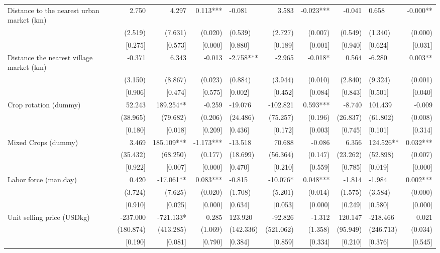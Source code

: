 \documentclass[
]{article}
\begin{document}
\begin{landscape}
\begin{ThreePartTable}
\begin{longtable}[t]{lrrrlrrrlr}
Distance to the nearest urban market (km) & 2.750 & 4.297 & 0.113*** & -0.081 & 3.583 & -0.023*** & -0.041 & 0.658 & -0.000**\\
 & (2.519) & (7.631) & (0.020) & (0.539) & (2.727) & (0.007) & (0.549) & (1.340) & (0.000)\\
 & {}[0.275] & {}[0.573] & {}[0.000] & {}[0.880] & {}[0.189] & {}[0.001] & {}[0.940] & {}[0.624] & {}[0.031]\\
Distance the nearest village market (km) & -0.371 & 6.343 & -0.013 & -2.758*** & -2.965 & -0.018* & 0.564 & -6.280 & 0.003**\\
 & (3.150) & (8.867) & (0.023) & (0.884) & (3.944) & (0.010) & (2.840) & (9.324) & (0.001)\\
 & {}[0.906] & {}[0.474] & {}[0.575] & {}[0.002] & {}[0.452] & {}[0.084] & {}[0.843] & {}[0.501] & {}[0.040]\\
Crop rotation (dummy) & 52.243 & 189.254** & -0.259 & -19.076 & -102.821 & 0.593*** & -8.740 & 101.439 & -0.009\\
 & (38.965) & (79.682) & (0.206) & (24.486) & (75.257) & (0.196) & (26.837) & (61.802) & (0.008)\\
 & {}[0.180] & {}[0.018] & {}[0.209] & {}[0.436] & {}[0.172] & {}[0.003] & {}[0.745] & {}[0.101] & {}[0.314]\\
Mixed Crops (dummy) & 3.469 & 185.109*** & -1.173*** & -13.518 & 70.688 & -0.086 & 6.356 & 124.526** & 0.032***\\
 & (35.432) & (68.250) & (0.177) & (18.699) & (56.364) & (0.147) & (23.262) & (52.898) & (0.007)\\
 & {}[0.922] & {}[0.007] & {}[0.000] & {}[0.470] & {}[0.210] & {}[0.559] & {}[0.785] & {}[0.019] & {}[0.000]\\
Labor force (man.day) & 0.420 & -17.061** & 0.083*** & -0.815 & -10.076* & 0.048*** & -1.814 & -1.984 & 0.002***\\
 & (3.724) & (7.625) & (0.020) & (1.708) & (5.201) & (0.014) & (1.575) & (3.584) & (0.000)\\
 & {}[0.910] & {}[0.025] & {}[0.000] & {}[0.634] & {}[0.053] & {}[0.000] & {}[0.249] & {}[0.580] & {}[0.000]\\
Unit selling price (USD\/kg) & -237.000 & -721.133* & 0.285 & 123.920 & -92.826 & -1.312 & 120.147 & -218.466 & 0.021\\
 & (180.874) & (413.285) & (1.069) & (142.336) & (521.062) & (1.358) & (95.949) & (246.713) & (0.034)\\
 & {}[0.190] & {}[0.081] & {}[0.790] & {}[0.384] & {}[0.859] & {}[0.334] & {}[0.210] & {}[0.376] & {}[0.545]\\

\end{longtable}
\end{ThreePartTable}
\end{landscape}
\end{document}
